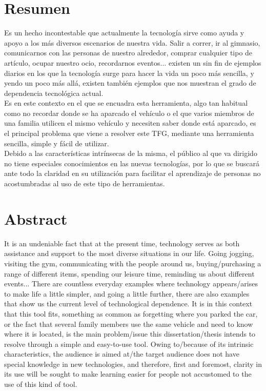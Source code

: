 \chapter{Resumen}

Es un hecho incontestable que actualmente la tecnología sirve como ayuda y apoyo a los más diversos escenarios de nuestra vida. Salir a correr, ir al gimnasio, comunicarnos con las personas de nuestro alrededor, comprar cualquier tipo de artículo, ocupar nuestro ocio, recordarnos eventos... existen un sin fin de ejemplos diarios en los que la tecnología surge para hacer la vida un poco más sencilla, y yendo un poco más allá, existen también ejemplos que nos muestran el grado de dependencia tecnológica actual.\\
Es en este contexto en el que se encuadra esta herramienta, algo tan habitual como no recordar donde se ha aparcado el vehículo o el que varios miembros de una familia utilicen el mismo vehículo y necesiten saber donde está aparcado, es el principal problema que viene a resolver este \ac{TFG}, mediante una herramienta sencilla, simple y fácil de utilizar.\\
Debido a las características intrínsecas de la misma, el público al que va dirigido no tiene especiales conocimientos en las nuevas tecnologías, por lo que se buscará ante todo la claridad en su utilización para facilitar el aprendizaje de personas no acostumbradas al uso de este tipo de herramientas.\\


\chapter{Abstract}

It is an undeniable fact that at the present time, technology serves as both assistance and support to the most diverse situations in our life. Going jogging, visiting the gym, communicating with the people around us, buying/purchasing a range of different items, spending our leisure time, reminding us about different events... There are countless everyday examples where technology appears/arises to make life a little simpler, and going a little further, there are also examples that show us the current level of technological dependence.
It is in this context that this tool fits, something as common as forgetting where you parked the car, or the fact that several family members use the same vehicle and need to know where it is located, is the main problem/issue this dissertation/thesis intends to resolve through a simple and easy-to-use tool. Owing to/because of its intrinsic characteristics, the audience is aimed at/the target audience does not have special knowledge in new technologies, and therefore, first and foremost, clarity in its use will be sought to make learning easier for people not accustomed to the use of this kind of tool.
